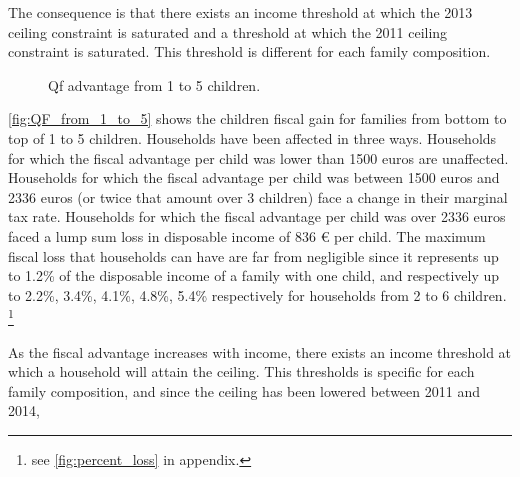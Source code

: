 The consequence is that there exists an income threshold at which the 2013 ceiling constraint is saturated and a threshold at which the 2011 ceiling constraint is saturated. This threshold is different for each family composition. 













\begin{figure}[H]
  \caption{Qf advantage from 1 to 5 children.}
  \label{fig:QF_from_1_to_5}
    \label{fig:key}
  \end{figure}
\medskip 

\autoref{fig:QF_from_1_to_5} shows the children fiscal gain for families from bottom to top of 1 to 5 children. 
Households have been affected in three ways. Households for which the fiscal advantage per child was lower than 1500 euros are unaffected. Households for which the fiscal advantage per child was between 1500 euros and 2336 euros (or twice that amount over 3 children) face a change in their marginal tax rate. 
Households for which the fiscal advantage per child was over 2336 euros faced a lump sum loss in disposable income of 836 \euro{} per child. The maximum fiscal loss that households can have are far from negligible since it represents up to 1.2\% of the disposable income of a family with one child, and respectively up to 2.2\%, 3.4\%, 4.1\%, 4.8\%, 5.4\% respectively for households from 2 to 6 children.
\footnote{see \autoref{fig:percent_loss} in appendix.}

As the fiscal advantage increases with income, there exists an income threshold at which a household will attain the ceiling. This thresholds is specific for each family composition, and since the ceiling has been lowered between 2011 and 2014, 

